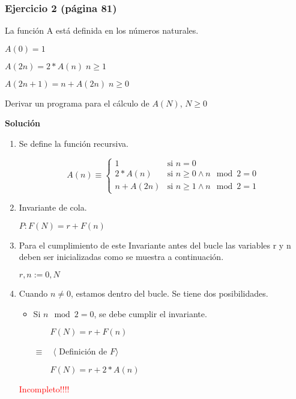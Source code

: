 \documentclass[hidelinks]{article}
\begin{document}
\newpage

\subsubsection{Ejercicio 2 (página 81)}

La función A está definida en los números naturales.\par

$A(0) = 1$\par
$A(2n) = 2*A(n) \; n \geq 1$\par
$A(2n + 1) = n + A(2n) \; n \geq 0$\par

Derivar un programa para el cálculo de $A(N)$, $N \geq 0$\par

\textbf{Solución}\par

\begin{enumerate}
	\item Se define la función recursiva.\par
	      \begin{equation}
		      A(n) \equiv
		      \begin{cases}
			      1         & \text{si } n = 0                       \\
			      2*A(n)    & \text{si } n \geq 0 \land n \mod 2 = 0 \\
			      n + A(2n) & \text{si } n \geq 1 \land n \mod 2 = 1
		      \end{cases}
	      \end{equation} \par

	\item Invariante de cola.\par
	      \begin{center}
		      $P: F(N) = r + F(n)$
	      \end{center}

	\item Para el cumplimiento de este Invariante antes del bucle las variables r y n
	      deben ser inicializadas como se muestra a continuación.\par
	      \begin{center}
		      $r,n := 0, N$
	      \end{center}
	\item Cuando $n \neq 0$, estamos dentro del bucle. Se tiene dos posibilidades.\par

	      \begin{itemize}
		      \item Si $n \mod 2 = 0$, se debe cumplir el invariante.\par
		            $\qquad F(N) = r + F(n)$\par
		            $\equiv \quad \langle$ Definición de $F \rangle$\par
		            $\qquad F(N) = r + 2*A(n)$\par
	      \end{itemize}
	      \textcolor{red}{Incompleto!!!!}
\end{enumerate}
\end{document}

